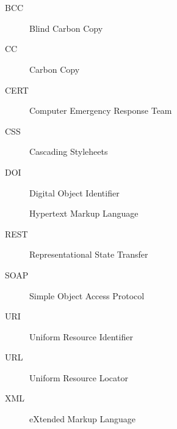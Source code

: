 \chapter*{\SeznamZkratek}

\begin{multicols}{2}
\raggedright
\begin{description}
\item [BCC] Blind Carbon Copy
\item [CC] Carbon Copy
\item [CERT] Computer Emergency Response Team
\item [CSS] Cascading Styleheets
\item [DOI] Digital Object Identifier
\item [] Hypertext Markup Language
\item [REST] Representational State Transfer
\item [SOAP] Simple Object Access Protocol
\item [URI] Uniform Resource Identifier
\item [URL] Uniform Resource Locator
\item [XML] eXtended Markup Language
\end{description}
\end{multicols}

